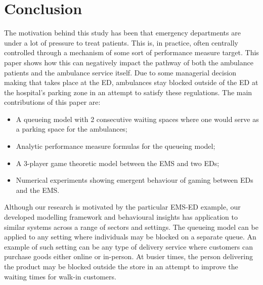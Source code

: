 \section{Conclusion}

The motivation behind this study has been that emergency departments are
under a lot of pressure to treat patients.
This is, in practice, often centrally controlled through a mechanism of some
sort of performance measure target.
This paper shows how this can negatively impact the pathway of both the
ambulance patients and the ambulance service itself.
Due to some managerial decision making that takes place at the ED, ambulances
stay blocked outside of the ED at the hospital's parking zone in an attempt
to satisfy these regulations.
The main contributions of this paper are:
\begin{itemize}
    \item A queueing model with 2 consecutive waiting spaces where one would
    serve as a parking space for the ambulances;
    \item Analytic performance measure formulas for the queueing model;
    \item A 3-player game theoretic model between the EMS and two EDs;
    \item Numerical experiments showing emergent behaviour of gaming between
    EDs and the EMS.
\end{itemize}
Although our research is motivated by the particular EMS-ED example, our 
developed modelling framework and behavioural insights has application to 
similar systems across a range of sectors and settings.
The queueing model can be applied to any setting where individuals may be
blocked on a separate queue.
An example of such setting can be any type of delivery service where customers
can purchase goods either online or in-person.
At busier times, the person delivering the product may be blocked outside the
store in an attempt to improve the waiting times for walk-in customers.

